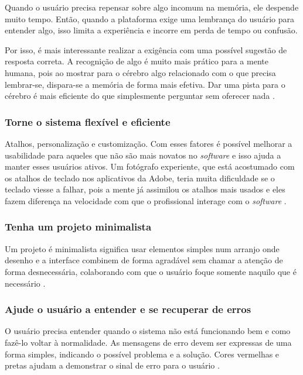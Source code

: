 Quando o usuário precisa repensar sobre algo incomum na memória, ele despende muito tempo. Então, quando a plataforma exige uma lembrança do usuário para entender algo, isso limita a experiência e incorre em perda de tempo ou confusão.

Por isso, é mais interessante realizar a exigência com uma possível sugestão de resposta correta. A recognição de algo é muito mais prático para a mente humana, pois ao mostrar para o cérebro algo relacionado com o que precisa lembrar-se, dispara-se a memória de forma mais efetiva. Dar uma pista para o cérebro é mais eficiente do que simplesmente perguntar sem oferecer nada \cite{site:nielsenRecall}.

\subsubsection{Torne o sistema flexível e eficiente}

Atalhos, personalização e customização. Com esses fatores é possível melhorar a usabilidade para aqueles que não são mais novatos no \textit{software} e isso ajuda a manter esses usuários ativos. Um fotógrafo experiente, que está acostumado com os atalhos de teclado nos aplicativos da Adobe, teria muita dificuldade se o teclado viesse a falhar, pois a mente já assimilou os atalhos mais usados e eles fazem diferença na velocidade com que o profissional interage com o \textit{software} \cite{site:nielsenFlexibility}.

\subsubsection{Tenha um projeto minimalista}

Um projeto é minimalista significa usar elementos simples num arranjo onde desenho e a interface combinem de forma agradável sem chamar a atenção de forma desnecessária, colaborando com que o usuário foque somente naquilo que é necessário \cite{site:nielsen}.

\subsubsection{Ajude o usuário a entender e se recuperar de erros}

O usuário precisa entender quando o sistema não está funcionando bem e como fazê-lo voltar à normalidade. As mensagens de erro devem ser expressas de uma forma simples, indicando o possível problema e a solução. 
Cores vermelhas e pretas ajudam a demonstrar o sinal de erro para o usuário \cite{site:nielsenError}.

